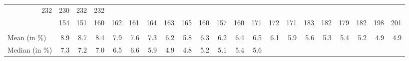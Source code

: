 \begin{tabular}{lllllllllllllllllllll}
  \multicolumn{1}{r}{232} &
  \multicolumn{1}{r}{230} &
  \multicolumn{1}{r}{232} &
  \multicolumn{1}{r}{232} \\
\multicolumn{1}{l}{\hspace{1em}{$\#$ origin countries}} &
  \multicolumn{1}{|r}{154} &
  \multicolumn{1}{r}{151} &
  \multicolumn{1}{r}{160} &
  \multicolumn{1}{r}{162} &
  \multicolumn{1}{r}{161} &
  \multicolumn{1}{r}{164} &
  \multicolumn{1}{r}{163} &
  \multicolumn{1}{r}{165} &
  \multicolumn{1}{r}{160} &
  \multicolumn{1}{r}{157} &
  \multicolumn{1}{r}{160} &
  \multicolumn{1}{r}{171} &
  \multicolumn{1}{r}{172} &
  \multicolumn{1}{r}{171} &
  \multicolumn{1}{r}{183} &
  \multicolumn{1}{r}{182} &
  \multicolumn{1}{r}{179} &
  \multicolumn{1}{r}{182} &
  \multicolumn{1}{r}{198} &
  \multicolumn{1}{r}{201} \\
\multicolumn{1}{l}{\hspace{1em}{\textit{Observed transport costs}}} &
  \multicolumn{1}{|r}{} &
  \multicolumn{1}{r}{} &
  \multicolumn{1}{r}{} &
  \multicolumn{1}{r}{} &
  \multicolumn{1}{r}{} &
  \multicolumn{1}{r}{} &
  \multicolumn{1}{r}{} &
  \multicolumn{1}{r}{} &
  \multicolumn{1}{r}{} &
  \multicolumn{1}{r}{} &
  \multicolumn{1}{r}{} &
  \multicolumn{1}{r}{} &
  \multicolumn{1}{r}{} &
  \multicolumn{1}{r}{} &
  \multicolumn{1}{r}{} &
  \multicolumn{1}{r}{} &
  \multicolumn{1}{r}{} &
  \multicolumn{1}{r}{} &
  \multicolumn{1}{r}{} &
  \multicolumn{1}{r}{} \\
\multicolumn{1}{l}{\hspace{2em}Mean (in $\%$)} &
  \multicolumn{1}{|r}{8.9} &
  \multicolumn{1}{r}{8.7} &
  \multicolumn{1}{r}{8.4} &
  \multicolumn{1}{r}{7.9} &
  \multicolumn{1}{r}{7.6} &
  \multicolumn{1}{r}{7.3} &
  \multicolumn{1}{r}{6.2} &
  \multicolumn{1}{r}{5.8} &
  \multicolumn{1}{r}{6.3} &
  \multicolumn{1}{r}{6.2} &
  \multicolumn{1}{r}{6.4} &
  \multicolumn{1}{r}{6.5} &
  \multicolumn{1}{r}{6.1} &
  \multicolumn{1}{r}{5.9} &
  \multicolumn{1}{r}{5.6} &
  \multicolumn{1}{r}{5.3} &
  \multicolumn{1}{r}{5.4} &
  \multicolumn{1}{r}{5.2} &
  \multicolumn{1}{r}{4.9} &
  \multicolumn{1}{r}{4.9} \\
\multicolumn{1}{l}{\hspace{2em}Median (in $\%$)} &
  \multicolumn{1}{|r}{7.3} &
  \multicolumn{1}{r}{7.2} &
  \multicolumn{1}{r}{7.0} &
  \multicolumn{1}{r}{6.5} &
  \multicolumn{1}{r}{6.6} &
  \multicolumn{1}{r}{5.9} &
  \multicolumn{1}{r}{4.9} &
  \multicolumn{1}{r}{4.8} &
  \multicolumn{1}{r}{5.2} &
  \multicolumn{1}{r}{5.1} &
  \multicolumn{1}{r}{5.4} &
  \multicolumn{1}{r}{5.6} &

\end{tabular}
